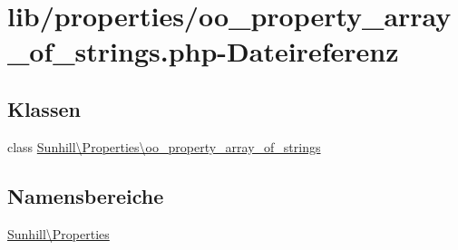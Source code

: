 \hypertarget{oo__property__array__of__strings_8php}{}\section{lib/properties/oo\+\_\+property\+\_\+array\+\_\+of\+\_\+strings.php-\/\+Dateireferenz}
\label{oo__property__array__of__strings_8php}
\subsection*{Klassen}
\begin{DoxyCompactItemize}
\item 
class \hyperlink{classSunhill_1_1Properties_1_1oo__property__array__of__strings}{Sunhill\textbackslash{}\+Properties\textbackslash{}oo\+\_\+property\+\_\+array\+\_\+of\+\_\+strings}
\end{DoxyCompactItemize}
\subsection*{Namensbereiche}
\begin{DoxyCompactItemize}
\item 
 \hyperlink{namespaceSunhill_1_1Properties}{Sunhill\textbackslash{}\+Properties}
\end{DoxyCompactItemize}
